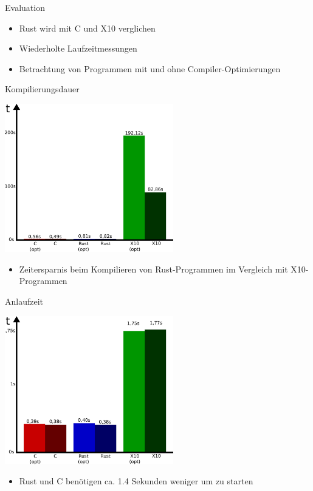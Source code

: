 \begin{frame}{Evaluation}
    \begin{itemize}
      \item Rust wird mit C und X10 verglichen
      \item Wiederholte Laufzeitmessungen
      \item Betrachtung von Programmen mit und ohne Compiler-Optimierungen
    \end{itemize}
\end{frame}

\begin{frame}{Kompilierungsdauer}
  \begin{center}
    \includegraphics[width=0.55\textwidth]{images/compile-eval.pdf}
  \end{center}
  \begin{itemize}
    \item Zeitersparnis beim Kompilieren von Rust-Programmen im Vergleich mit X10-Programmen
  \end{itemize}
\end{frame}

\begin{frame}{Anlaufzeit}
  \begin{center}
    \includegraphics[width=0.55\textwidth]{images/startup-eval.pdf}
  \end{center}
  \begin{itemize}
    \item Rust und C benötigen ca. 1.4 Sekunden weniger um zu starten
  \end{itemize}
\end{frame}

